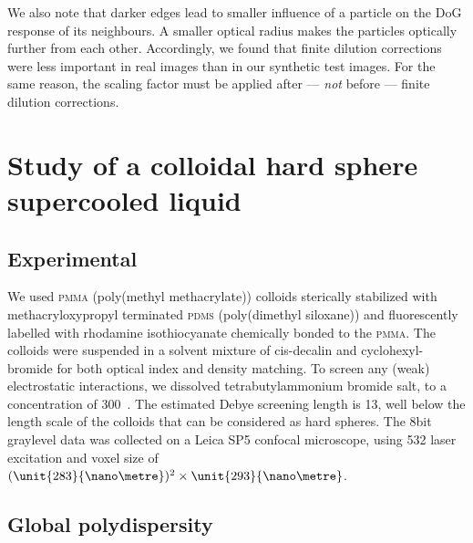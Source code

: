 \documentclass[8.5pt,twoside,twocolumn]{article}
\begin{document}
We also note that darker edges lead to smaller influence of a particle on the DoG response of its neighbours. A smaller optical radius makes the particles optically further from each other. Accordingly, we found that finite dilution corrections were less important in real images than in our synthetic test images. For the same reason, the scaling factor must be applied after --- \emph{not} before --- finite dilution corrections.


\section*{Study of a colloidal hard sphere supercooled liquid}

\subsection*{Experimental}
We used \textsc{pmma} (poly(methyl methacrylate)) colloids sterically stabilized with methacryloxypropyl terminated \textsc{pdms} (poly(dimethyl siloxane)) and fluorescently labelled with rhodamine isothiocyanate chemically bonded to the \textsc{pmma}. The colloids were suspended in a solvent mixture of cis-decalin and cyclohexyl-bromide for both optical index and density matching. To screen any (weak) electrostatic interactions, we dissolved tetrabutylammonium bromide salt, to a concentration of \unit{300}{\nano\mole\per\liter}~\citep{royall2005}. The estimated Debye screening length is \unit{13}{\nano\metre}, well below the length scale of the colloids that can be considered as hard spheres. The \unit{8}{bit} graylevel data was collected on a Leica SP5 confocal microscope, using \unit{532}{\nano\meter} laser excitation and voxel size of $(\unit{283}{\nano\metre})^2\times\unit{293}{\nano\metre}$.

\subsection*{Global polydispersity}
\end{document}
